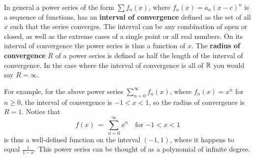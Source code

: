 In general a power series of the form
$\sum f_n(x)$, where $f_n(x)=a_n (x-c)^n$ is a sequence of functions, has an
\textbf{interval of convergence}
defined as the set of all $x$ such that the series converges. The interval can
be any combination of open or closed, as well as the extreme cases of a single
point or all real numbers.  On its interval of
convergence the power series is thus a function of $x$.
The \textbf{radius of convergence} $R$ of a power series is defined as half the
length of the interval of convergence. In the case
where the interval of convergence is all of $\mathbb{R}$ you would say $R=\infty$.

For example, for the above power series
$\sum_{n=0}^{\infty} f_n(x)$, where $f_n(x) = x^n$ for
$n\ge 0$, the interval of convergence is $-1<x<1$, so the radius of
convergence is $R=1$. Notice that
\[
f(x) ~=~ \sum_{n=0}^{\infty} x^n \quad\text{for $-1<x<1$}
\]
is thus a well-defined function on the interval $(-1,1)$, where it happens to
equal $\frac{1}{1-x}$. This power
series can be thought of as a polynomial of infinite degree.

